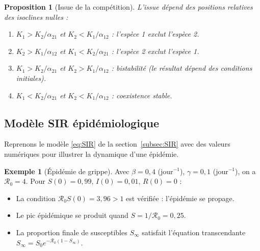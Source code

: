 \documentclass[12pt,a4paper,openany]{book}
\theoremstyle{definition}
\newtheorem{exemple}[definition]{Exemple}
\theoremstyle{plain}
\newtheorem{proposition}[definition]{Proposition}
\theoremstyle{remark}
\begin{document}
\begin{proposition}[Issue de la compétition]
\label{prop:competition}
L'issue dépend des positions relatives des isoclines nulles :
\begin{enumerate}[label=(\roman*)]
  \item $K_1 > K_2/\alpha_{21}$ et $K_2 < K_1/\alpha_{12}$ :
        l'espèce 1 exclut l'espèce 2.
  \item $K_2 > K_1/\alpha_{12}$ et $K_1 < K_2/\alpha_{21}$ :
        l'espèce 2 exclut l'espèce 1.
  \item $K_1 > K_2/\alpha_{21}$ et $K_2 > K_1/\alpha_{12}$ :
        bistabilité (le résultat dépend des conditions initiales).
  \item $K_1 < K_2/\alpha_{21}$ et $K_2 < K_1/\alpha_{12}$ :
        coexistence stable.
\end{enumerate}
\end{proposition}

\subsection{Modèle SIR épidémiologique}
\label{subsec:SIR-app}

Reprenons le modèle \eqref{eq:SIR} de la section~\ref{subsec:SIR}
avec des valeurs numériques pour illustrer la dynamique d'une
épidémie.

\begin{exemple}[Épidémie de grippe]
\label{ex:grippe-SIR}
Avec $\beta = 0{,}4$ (jour$^{-1}$), $\gamma = 0{,}1$ (jour$^{-1}$),
on a $\mathcal{R}_0 = 4$. Pour $S(0) = 0{,}99$, $I(0) = 0{,}01$,
$R(0) = 0$ :
\begin{itemize}
  \item La condition $\mathcal{R}_0 S(0) = 3{,}96 > 1$ est vérifiée :
        l'épidémie se propage.
  \item Le pic épidémique se produit quand
        $S = 1/\mathcal{R}_0 = 0{,}25$.
  \item La proportion finale de susceptibles $S_\infty$ satisfait
        l'équation transcendante
        $S_\infty = S_0 e^{-\mathcal{R}_0(1-S_\infty)}$.
\end{itemize}
\end{exemple}

\begin{center}
\end{center}
\end{document}
